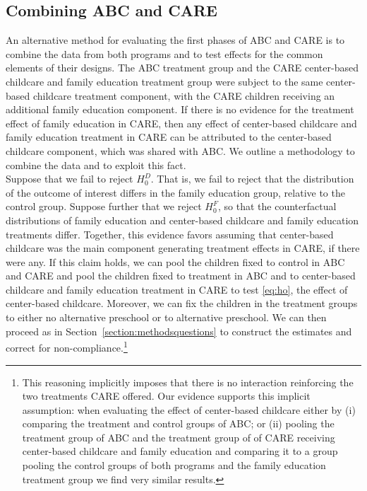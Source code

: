 \subsection{Combining ABC and CARE} \label{section:combine}

\noindent An alternative method for evaluating the first phases of ABC and CARE is to combine the data from both programs and to test effects for the common elements of their designs. The ABC treatment group and the CARE center-based childcare and family education treatment group were subject to the same center-based childcare treatment component, with the CARE children receiving an additional family education component. If there is no evidence for the treatment effect of family education in CARE, then any effect of center-based childcare and family education treatment in CARE can be attributed to the center-based childcare component, which was shared with ABC. We outline a methodology to combine the data and to exploit this fact.\\

\noindent Suppose that we fail to reject $H_{0}^D$. That is, we fail to reject that the distribution of the outcome of interest differs in the family education group, relative to the control group. Suppose further that we reject $H_{0}^F$, so that the counterfactual distributions of family education and center-based childcare and family education treatments differ. Together, this evidence favors assuming that center-based childcare was the main component generating treatment effects in CARE, if there were any. If this claim holds, we can pool the children fixed to control in ABC and CARE and pool the children fixed to treatment in ABC and to center-based childcare and family education treatment in CARE to test \eqref{eq:ho}, the effect of center-based childcare. Moreover, we can fix the children in the treatment groups to either no alternative preschool or to alternative preschool. We can then proceed as in Section~\ref{section:methodsquestions} to construct the estimates and correct for non-compliance.\footnote{This reasoning implicitly imposes that there is no interaction reinforcing the two treatments CARE offered. Our evidence supports this implicit assumption: when evaluating the effect of center-based childcare either by (i) comparing the treatment and control groups of ABC; or (ii) pooling the treatment group of ABC and the treatment group of of CARE receiving center-based childcare and family education and comparing it to a group pooling the control groups of both programs and the family education treatment group we find very similar results.}\\


